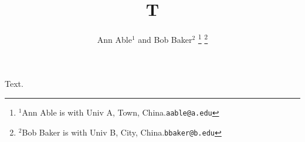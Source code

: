 \documentclass{article}
\begin{document}
\title{T}
\author{Ann Able$^{1}$ and Bob Baker$^{2}$
\thanks{$^{1}$Ann Able is with Univ A, Town, China.{\tt\footnotesize aable@a.edu}}%
\thanks{$^{2}$Bob Baker is with Univ B, City, China.{\tt\footnotesize bbaker@b.edu}}%
}
\maketitle
Text.
\end{document}

